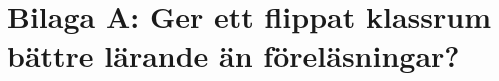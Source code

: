 %

\section{Bilaga A: Ger ett flippat klassrum bättre lärande än
  föreläsningar?}
\label{app:flippat}

